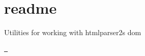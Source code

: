 \chapter{readme}
\hypertarget{md_node__modules_2svgo_2node__modules_2domutils_2readme}{}\label{md_node__modules_2svgo_2node__modules_2domutils_2readme}
Utilities for working with htmlparser2\textquotesingle{}s dom

\href{https://travis-ci.org/fb55/domutils}{\texttt{ }} 
